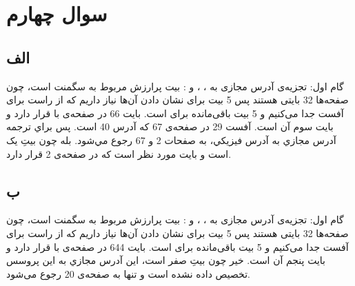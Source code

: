 \documentclass{article}
\begin{document}
\section{سوال چهارم}
\subsection{الف}
گام اول: تجزیه‌ی آدرس مجازی به ، ، و :
 بیت پرارزش مربوط به سگمنت است، چون صفحه‌ها 32 بایتی هستند پس 5 بیت برای نشان دادن آن‌ها نیاز داریم که از راست برای آفست جدا می‌کنیم و 5 بیت باقی‌مانده برای  است.
\newline
{}
\newline
{}
\newline
{}
\newline
{}
\newline
\newline
{}
\newline
بایت 66 در صفحه‌ی با  قرار دارد و بایت سوم آن است.
\newline
{}
\newline
{}
\newline
{}
\newline
{}
\newline
آفست 29 در صفحه‌ی 67 که آدرس 40 است. پس براي ترجمه آدرس مجازي به آدرس فيزيكي، به صفحات 2 و 67 رجوع مي‌شود.
\newline
بله چون بیتِ  یک است و بایت مورد نظر  است که در صفحه‌ی 2 قرار دارد.
\subsection{ب}
گام اول: تجزیه‌ی آدرس مجازی به ، ، و :
 بیت پرارزش مربوط به سگمنت است، چون صفحه‌ها 32 بایتی هستند پس 5 بیت برای نشان دادن آن‌ها نیاز داریم که از راست برای آفست جدا می‌کنیم و 5 بیت باقی‌مانده برای  است.
\newline
{}
\newline
{}
\newline
{}
\newline
{}
\newline
\newline
{}
\newline
بایت 644 در صفحه‌ی با  قرار دارد و بایت پنجم آن است.
\newline
{}
\newline
{}
\newline
{}
\newline
خیر چون بیتِ  صفر است، اين آدرس مجازي به اين پروسس تخصيص داده نشده است و تنها به صفحه‌ی 20 رجوع می‌شود.
\end{document}
